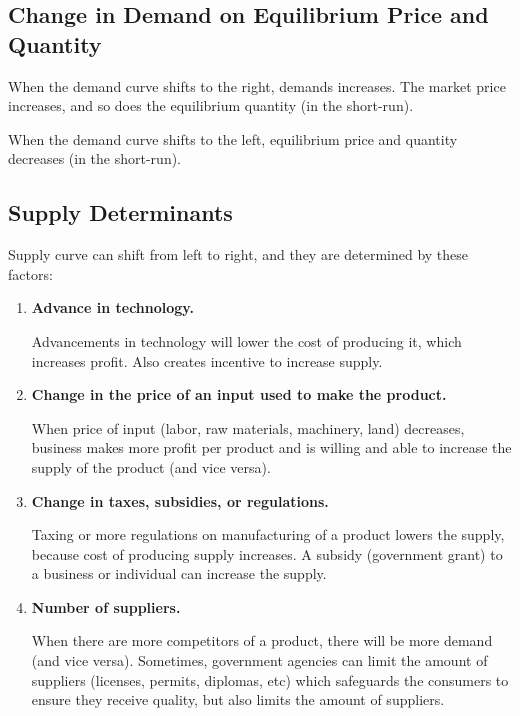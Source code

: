 \documentclass[a4paper, 12pt] {article}
\begin{document}
\subsection{Change in Demand on Equilibrium Price and Quantity}
When the demand curve shifts to the right, demands increases. The market price
increases, and so does the equilibrium quantity (in the short-run).

When the demand curve shifts to the left, equilibrium price and quantity decreases
(in the short-run).

\subsection{Supply Determinants}
Supply curve can shift from left to right, and they are determined by these
factors:

\begin{enumerate}
    \item \textbf{Advance in technology.}

        Advancements in technology will lower the cost of producing it, which
        increases profit. Also creates incentive to increase supply.

    \item \textbf{Change in the price of an input used to make the product.}
        
        When price of input (labor, raw materials, machinery, land) decreases,
        business makes more profit per product and is willing and able to
        increase the supply of the product (and vice versa).

    \item \textbf{Change in taxes, subsidies, or regulations.}

        Taxing or more regulations on manufacturing of a product lowers the 
        supply, because cost of producing supply increases. A subsidy (government
        grant) to a business or individual can increase the supply.

    \item \textbf{Number of suppliers.}

        When there are more competitors of a product, there will be more demand
        (and vice versa). Sometimes, government agencies can limit the amount of
        suppliers (licenses, permits, diplomas, etc) which safeguards the consumers
        to ensure they receive quality, but also limits the amount of suppliers.
\end{enumerate}
\end{document}
